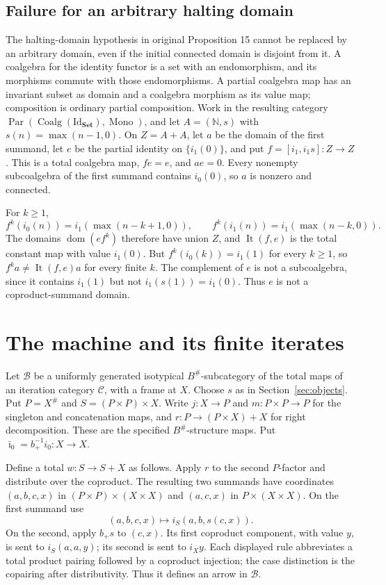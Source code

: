 \documentclass[11pt]{article}
\newcommand{\C}{\mathcal C}\newcommand{\D}{\mathcal D}\newcommand{\B}{\mathcal B}
\newcommand{\dom}{\operatorname{dom}}\newcommand{\ran}{\operatorname{ran}}
\newcommand{\It}{\operatorname{It}}\newcommand{\Tur}{\operatorname{Tur}}
\begin{document}
\subsection{Failure for an arbitrary halting domain}
The halting-domain hypothesis in original Proposition 15 cannot be replaced
by an arbitrary domain, even if the initial connected domain is
disjoint from it. A coalgebra for the identity functor is a set with an endomorphism, and its morphisms commute with those endomorphisms. A partial coalgebra map has an invariant subset as domain and a coalgebra morphism as its value map; composition is ordinary partial composition. Work in the resulting category $\operatorname{Par}(\operatorname{Coalg}(\mathrm{Id}_{\mathbf{Set}}),\operatorname{Mono})$, and let $A=(\mathbb N,s)$ with
$s(n)=\max(n-1,0)$. On $Z=A+A$, let $a$ be the domain of the first
summand, let $e$ be the partial identity on $\{i_1(0)\}$, and put
$f=[i_1,i_1s]:Z\to Z$. This is a total coalgebra map, $fe=e$, and
$ae=0$. Every nonempty subcoalgebra of the first summand contains
$i_0(0)$, so $a$ is nonzero and connected.

For $k\geq1$,
\[
f^k(i_0(n))=i_1(\max(n-k+1,0)),\qquad
f^k(i_1(n))=i_1(\max(n-k,0)).
\]
The domains $\dom(ef^k)$ therefore have union $Z$, and
$\It(f,e)$ is the total constant map with value $i_1(0)$.
But $f^k(i_0(k))=i_1(1)$ for every $k\geq1$, so
$f^ka\ne\It(f,e)a$ for every finite $k$. The complement of $e$
is not a subcoalgebra, since it contains $i_1(1)$ but not
$i_1(s(1))=i_1(0)$. Thus $e$ is not a coproduct-summand domain.

\section{The machine and its finite iterates}\label{sec:machine}
Let $\B$ be a uniformly generated isotypical $B^\#$-subcategory of the total maps of an iteration category $\C$, with a frame at $X$. Choose $s$ as in Section~\ref{sec:objects}. Put $P=X^\#$ and $S=(P\times P)\times X$. Write $j:X\to P$ and $m:P\times P\to P$ for the singleton and concatenation maps, and $r:P\to(P\times X)+X$ for right decomposition. These are the specified $B^\#$-structure maps. Put $\bar\imath_0=b_+^{-1}i_0:X\to X$.

Define a total $w:S\to S+X$ as follows. Apply $r$ to the second $P$-factor and distribute over the coproduct. The resulting two summands have coordinates $(a,b,c,x)$ in $(P\times P)\times(X\times X)$ and $(a,c,x)$ in $P\times(X\times X)$. On the first summand use
\[
(a,b,c,x)\longmapsto i_S(a,b,s(c,x)).
\]
On the second, apply $b_+s$ to $(c,x)$. Its first coproduct component, with value $y$, is sent to $i_S(a,a,y)$; its second is sent to $i_Xy$. Each displayed rule abbreviates a total product pairing followed by a coproduct injection; the case distinction is the copairing after distributivity. Thus it defines an arrow in $\B$.
\end{document}
